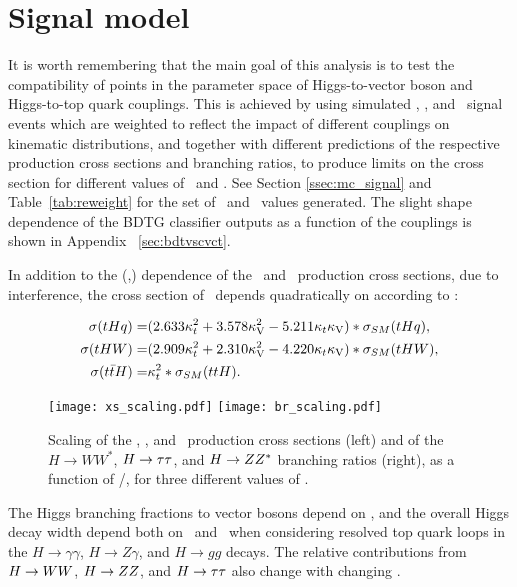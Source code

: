 
\section{Signal model}

It is worth remembering that the main goal of this analysis is to test the compatibility of points in the parameter space of Higgs-to-vector boson and Higgs-to-top quark couplings. This is achieved by using simulated \tHq, \tHW, and \ttH\ signal events which are weighted to reflect the impact of different couplings on kinematic distributions, and together with different predictions of the respective production cross sections and branching ratios, to produce limits on the cross section for different values of \CV\ and \Ct. See Section \ref{ssec:mc_signal} and Table~\ref{tab:reweight} for the set of \Ct\ and \CV\ values generated. The slight shape dependence of the BDTG classifier outputs as a function of the couplings is shown in Appendix ~\ref{sec:bdtvscvct}.

In addition to the (\Ct,\CV) dependence of the \tHq\ and \tHW\ production cross sections, due to interference, the cross section of \ttH\ depends quadratically on \Ct according to \cite{kcouplings}:

\begin{align}
\sigma(tHq) =& (2.633 \kappa_t^2 + 3.578 \kappa_\text{V}^2 - 5.211 \kappa_t\kappa_\text{V}) * \sigma_{SM}(tHq),\\
\sigma(tHW) =& (2.909 \kappa_t^2 + 2.310 \kappa_\text{V}^2 - 4.220 \kappa_t\kappa_\text{V}) * \sigma_{SM}(tHW),\\
\sigma(t\bar{t}H) =& \kappa_t^2 * \sigma_{SM}(ttH).
\end{align}

\begin{figure} [!h]
 \centering
  \texttt{[image: xs\_scaling.pdf]}
  \texttt{[image: br\_scaling.pdf]}
\caption[Scaling of the \tHq, \tHW, and \ttH\ production cross section  with \Ct/\CV.]{Scaling of the \tHq, \tHW, and \ttH\ production cross sections (left) and of the $H\to WW^*$, $H\to\tau\tau$, and $H\to ZZ^*$ branching ratios (right), as a function of \Ct/\CV, for three different values of \CV.}
\label{fig:xsbrscalings}
\end{figure}

The Higgs branching fractions to vector bosons depend on \CV, and the overall Higgs decay width depend both on \Ct\ and \CV\ when considering resolved top quark loops in the $H\to\gamma\gamma$, $H\to Z\gamma$, and $H\to gg$ decays. The relative contributions from $ H\to WW$, $H\to ZZ$, and $H\to\tau\tau$ also change with changing \CV.

